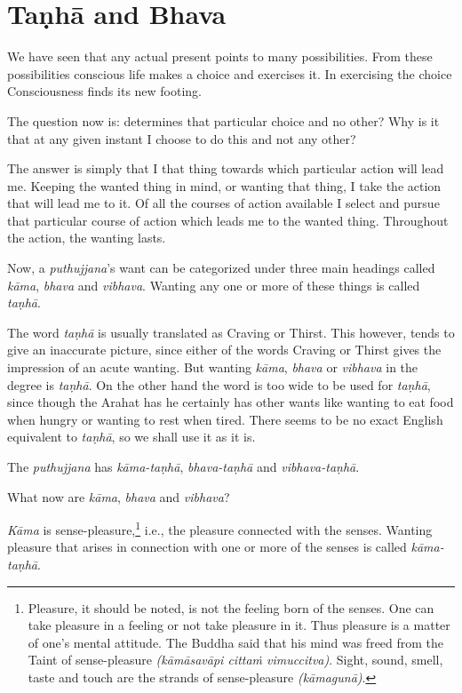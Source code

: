 \chapter{Taṇhā and Bhava}

We have seen that any actual present points to many possibilities. From these possibilities conscious life makes a choice and exercises it. In exercising the choice Consciousness finds its new footing.

The question now is:  determines that particular choice and no other? Why is it that at any given instant I choose to do this and not any other?

The answer is simply that I  that thing towards which  particular action will lead me. Keeping the wanted thing in mind, or wanting that thing, I take the action that will lead me to it. Of all the courses of action available I select and pursue that particular course of action which leads me to the wanted thing. Throughout the action, the wanting lasts.

Now, a \emph{puthujjana}'s want can be categorized under three main headings called \emph{kāma}, \emph{bhava} and \emph{vibhava}. Wanting any one or more of these things is called \emph{taṇhā}.

The word \emph{taṇhā} is usually translated as Craving or Thirst. This however, tends to give an inaccurate picture, since either of the words Craving or Thirst gives the impression of an acute wanting. But wanting \emph{kāma}, \emph{bhava} or \emph{vibhava} in the  degree is \emph{taṇhā}. On the other hand the word  is too wide to be used for \emph{taṇhā}, since though the Arahat has  he certainly has other wants like wanting to eat food when hungry or wanting to rest when tired. There seems to be no exact English equivalent to \emph{taṇhā}, so we shall use it as it is.

The \emph{puthujjana} has \emph{kāma-taṇhā}, \emph{bhava-taṇhā} and \emph{vibhava-taṇhā}.

What now are \emph{kāma}, \emph{bhava} and \emph{vibhava}?

\emph{Kāma} is sense-pleasure,\footnote{Pleasure, it should be noted, is not the feeling born of the senses. One can take pleasure in a feeling or not take pleasure in it. Thus pleasure is a matter of one's mental attitude. The Buddha said that his mind was freed from the Taint of sense-pleasure \emph{(kāmāsavāpi cittaṁ vimuccitva)}. Sight, sound, smell, taste and touch are the strands of sense-pleasure \emph{(kāmagunā)}.} i.e., the pleasure connected with the senses. Wanting pleasure that arises in connection with one or more of the senses is called \emph{kāma-taṇhā}.

